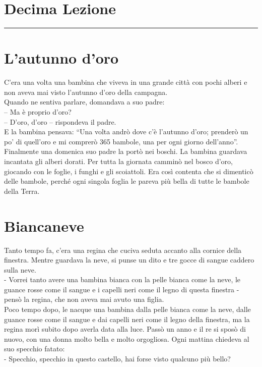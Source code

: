 \documentclass[letter,11pt]{article}
\begin{document}
\section*{\Large{Decima Lezione}}
\noindent\rule{16cm}{1pt}

\setlength{\parindent}{260pt}

\vskip 0.2in
\section*{L'autunno  d'oro}
\vskip 0.2in

\noindent C’era una volta una bambina che viveva in una grande città con pochi alberi e non aveva mai visto l’autunno d’oro della campagna. \\
Quando ne sentiva parlare, domandava a suo padre: \\
– Ma è proprio d’oro? \\
– D’oro, d’oro – rispondeva il padre. \\
E la bambina pensava: “Una volta andrò dove c’è l’autunno d’oro; prenderò un po’ di quell’oro e mi comprerò 365 bambole, una per ogni giorno dell’anno”. \\
Finalmente una domenica suo padre la portò nei boschi. La bambina guardava incantata gli alberi dorati. Per tutta la giornata camminò nel bosco d’oro, giocando con le foglie, i funghi e gli scoiattoli. Era così contenta che si dimenticò delle bambole, perché ogni singola foglia le pareva più bella di tutte le bambole della Terra.

\vskip 0.2in
\section*{Biancaneve}
\vskip 0.2in
\noindent Tanto tempo fa, c’era una regina che cuciva seduta accanto alla cornice della finestra. Mentre guardava la neve, si punse un dito e tre gocce di sangue caddero sulla neve. \\
- Vorrei tanto avere una bambina bianca con la pelle bianca come la neve, le guance rosse come il sangue e i capelli neri come il legno di questa finestra - pensò la regina, che non aveva mai avuto una figlia. \\
Poco tempo dopo, le nacque una bambina dalla pelle bianca come la neve, dalle guance rosse come il sangue e dai capelli neri come il legno della finestra, ma la regina morì subito dopo averla data alla luce. Passò un anno e il re si sposò di nuovo, con una donna molto bella e molto orgogliosa. Ogni mattina chiedeva al suo specchio fatato: \\
- Specchio, specchio in questo castello, hai forse visto qualcuno più bello?
\end{document}
